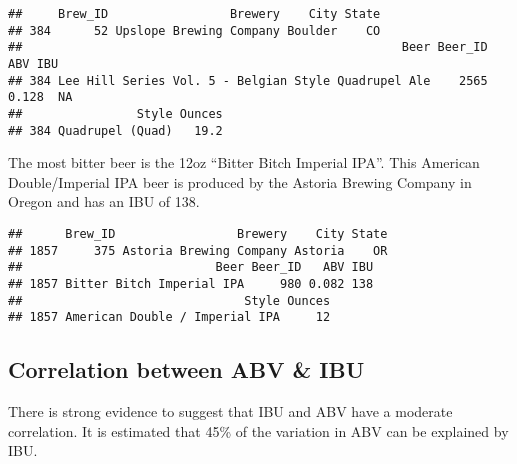 \documentclass[]{article}
\newenvironment{Shaded}{\begin{snugshade}}{\end{snugshade}}
\newcommand{\DataTypeTok}[1]{\textcolor[rgb]{0.13,0.29,0.53}{#1}}
\newcommand{\FloatTok}[1]{\textcolor[rgb]{0.00,0.00,0.81}{#1}}
\newcommand{\KeywordTok}[1]{\textcolor[rgb]{0.13,0.29,0.53}{\textbf{#1}}}
\newcommand{\NormalTok}[1]{#1}
\newcommand{\OperatorTok}[1]{\textcolor[rgb]{0.81,0.36,0.00}{\textbf{#1}}}
\newcommand{\StringTok}[1]{\textcolor[rgb]{0.31,0.60,0.02}{#1}}
\begin{document}
\begin{verbatim}
##     Brew_ID                 Brewery    City State
## 384      52 Upslope Brewing Company Boulder    CO
##                                                     Beer Beer_ID   ABV IBU
## 384 Lee Hill Series Vol. 5 - Belgian Style Quadrupel Ale    2565 0.128  NA
##                Style Ounces
## 384 Quadrupel (Quad)   19.2
\end{verbatim}

The most bitter beer is the 12oz ``Bitter Bitch Imperial IPA''. This
American Double/Imperial IPA beer is produced by the Astoria Brewing
Company in Oregon and has an IBU of 138.

\begin{Shaded}
\end{Shaded}

\begin{verbatim}
##      Brew_ID                 Brewery    City State
## 1857     375 Astoria Brewing Company Astoria    OR
##                           Beer Beer_ID   ABV IBU
## 1857 Bitter Bitch Imperial IPA     980 0.082 138
##                               Style Ounces
## 1857 American Double / Imperial IPA     12
\end{verbatim}

\hypertarget{correlation-between-abv-ibu}{%
\subsection{Correlation between ABV \&
IBU}\label{correlation-between-abv-ibu}}

There is strong evidence to suggest that IBU and ABV have a moderate
correlation. It is estimated that 45\% of the variation in ABV can be
explained by IBU.

\begin{Shaded}
\end{Shaded}
\end{document}
